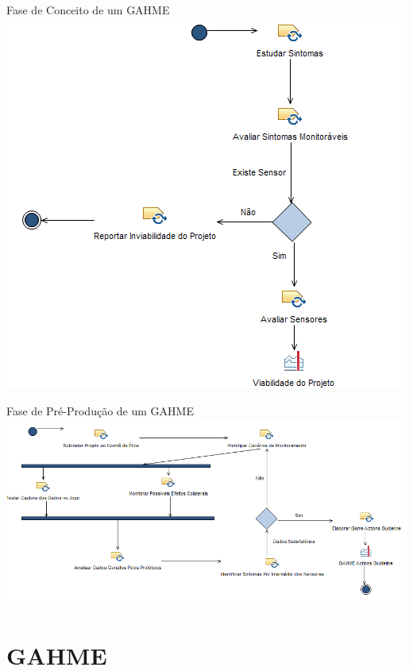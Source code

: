 \documentclass{beamer}
\begin{document}
\begin{frame}{Fase de Conceito de um GAHME}
      \center \includegraphics[height=2.8 in]{img/gahme-fase-conceito.png}
\end{frame}

\begin{frame}{Fase de Pré-Produção de um GAHME}
      \center \includegraphics[height=2.1 in]{img/gahme-fase-pre-producao.png}
\end{frame}


\section{GAHME}
\end{document}

